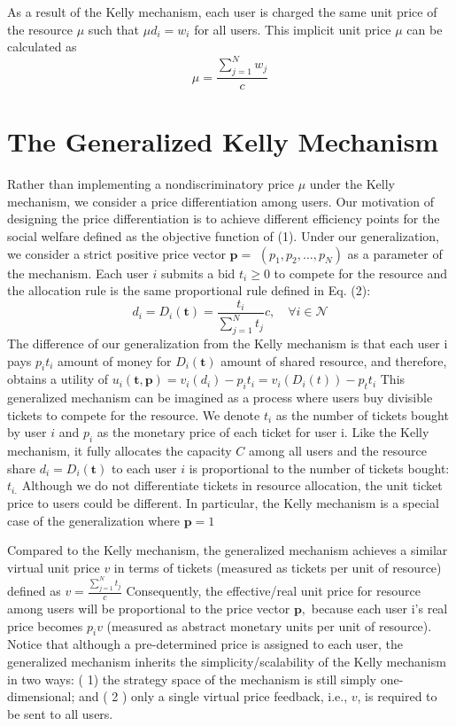 As a result of the Kelly mechanism, each user is charged the same unit price of the resource $\mu$ such that $\mu d_{i}=w_{i}$ for all users. This implicit unit price $\mu$ can be calculated as
$$
\mu=\frac{\sum_{j=1}^{N} w_{j}}{c}
$$

\section{The Generalized Kelly Mechanism}

Rather than implementing a nondiscriminatory price $\mu$ under the Kelly mechanism, we consider a price differentiation among users. Our motivation of designing the price differentiation is to achieve different efficiency points for the social welfare defined as the objective function of (1). Under our generalization, we consider a strict positive price vector $\mathbf{p}=$ $\left(p_{1}, p_{2}, \ldots, p_{N}\right)$ as a parameter of the mechanism. Each user $i$ submits a bid $t_{i} \geq 0$ to compete for the resource and the allocation rule is the same proportional rule defined in Eq. (2):
$$
d_{i}=D_{i}(\mathbf{t})=\frac{t_{i}}{\sum_{j=1}^{N} t_{j}} c, \quad \forall i \in \mathcal{N}
$$
The difference of our generalization from the Kelly mechanism is that each user i pays $p_{i} t_{i}$ amount of money for $D_{i}(\mathbf{t})$ amount
of shared resource, and therefore, obtains a utility of $u_{i}(\mathbf{t}, \mathbf{p})=v_{i}\left(d_{i}\right)-p_{i} t_{i}=v_{i}\left(D_{i}(t)\right)-p_{t} t_{i}$
This generalized mechanism can be imagined as a process where users buy divisible tickets to compete for the resource. We denote $t_{i}$ as the number of tickets bought by user $i$ and $p_{i}$ as the monetary price of each ticket for user i. Like the Kelly mechanism, it fully allocates the capacity $C$ among all users and the resource share $d_{i}=D_{i}(\mathbf{t})$ to each user $i$ is proportional to the number of tickets bought: $t_{i .}$ Although we do not differentiate tickets in resource allocation, the unit ticket price to users could be different. In particular, the Kelly mechanism is a special case of the generalization where $\mathbf{p}=1$

Compared to the Kelly mechanism, the generalized mechanism achieves a similar virtual unit price $v$ in terms of tickets (measured as tickets per unit of resource) defined as $v=\frac{\sum_{j=1}^{N} t_{j}}{c}$
Consequently, the effective/real unit price for resource among users will be proportional to the price vector $\mathbf{p},$ because each user i's real price becomes $p_{i} v$ (measured as abstract monetary units per unit of resource). Notice that although a pre-determined price is assigned to each user, the generalized mechanism inherits the simplicity/scalability of the Kelly mechanism in two ways: ( 1) the strategy space of the mechanism is still simply one-dimensional; and ( 2 ) only a single virtual price feedback, i.e., $v$, is required to be sent to all users.